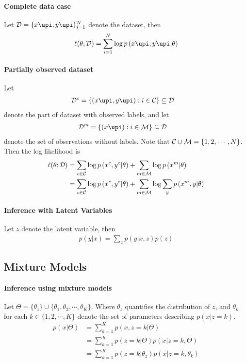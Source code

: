 \documentclass{article}
\begin{document}
	\paragraph{Complete data case} Let $\mc{D} = \{x\upi, y\upi\}_{i=1}^N$ denote the dataset, then
	\begin{align}
		\ell(\theta ; \mathcal{D})=\sum_{i=1}^N \log p\left(x\upi, y\upi | \theta\right)
	\end{align}
	\paragraph{Partially observed dataset} Let
	\begin{align}
		\mc{D}^c &= \{(x\upi, y\upi): i \in \mc{C}\} \subseteq \mc{D}
	\end{align}
	denote the part of dataset with observed labels, and let
	\begin{align}
		\mc{D}^m &= \{(x\upi): i \in \mc{M}\} \subseteq \mc{D}
	\end{align}
	denote the set of observations without labels. Note that $\mathcal{{C}} \cup \mathcal{{M}} = \{1, 2, \cdots, N\}$. \\
	Then the log likelihood is
	\begin{align}
		\ell(\theta ; \mathcal{D})
		&= \sum_{c \in \mathcal{{C}}} \log p\left(x^{c}, y^{c} | \theta\right)
		+ \sum_{m \in \mathcal{{M}}} \log p\left(x^{m} | \theta\right) \\
		&=\sum_{c \in \mathcal{{C}}} \log p\left(x^{c}, y^{c} | \theta\right)
		+ \sum_{m \in \mathcal{{M}}} \log \sum_{y} p\left(x^{m}, y | \theta\right)
	\end{align}
	\paragraph{Inference with Latent Variables} Let $z$ denote the latent variable, then
	\begin{align}
		p(y | x)=\sum_{z} p(y | x, z) p(z)
	\end{align}
	
	\subsection{Mixture Models}
	
	\paragraph{Inference using mixture models} Let $\Theta = \{\theta_z\} \cup \{ \theta_1, \theta_2, \cdots, \theta_K \}$. Where $\theta_z$ quantifies the distribution of $z$, and $\theta_k$ for each $k \in \{1,2,\cdots,K\}$ denote the set of parameters describing $p(x|z=k)$.
	\begin{align}
		p(x | \Theta) &= \sum_{k=1}^K p(x, z=k|\Theta) \\
		&= \sum_{k=1}^K p(z=k|\Theta) p(x|z=k, \Theta) \\
		&= \sum_{k=1}^{K} p\left(z=k | \theta_{z}\right) p\left(x | z=k, \theta_{k}\right)
	\end{align}
	
\end{document}
